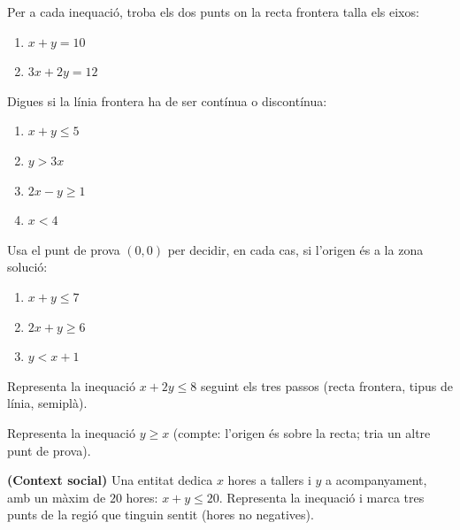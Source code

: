 \begin{exercicis}
\begin{exlist}
  \item Per a cada inequació, troba els dos punts on la recta frontera talla els
        eixos:
        \begin{enumerate}[label=\alph*), leftmargin=1.6em, topsep=2pt]
          \item $x+y=10$ \hfill \item $3x+2y=12$
        \end{enumerate}
  \item Digues si la línia frontera ha de ser contínua o discontínua:
        \begin{enumerate}[label=\alph*), leftmargin=1.6em, topsep=2pt]
          \item $x+y\le 5$ \hfill \item $y>3x$ \hfill \item $2x-y\ge 1$ \hfill
          \item $x<4$
        \end{enumerate}
  \item Usa el punt de prova $(0,0)$ per decidir, en cada cas, si l'origen és a la
        zona solució:
        \begin{enumerate}[label=\alph*), leftmargin=1.6em, topsep=2pt]
          \item $x+y\le 7$ \hfill \item $2x+y\ge 6$ \hfill \item $y<x+1$
        \end{enumerate}
  \item Representa la inequació $x+2y\le 8$ seguint els tres passos (recta frontera,
        tipus de línia, semiplà).
  \item Representa la inequació $y\ge x$ (compte: l'origen és sobre la recta; tria un
        altre punt de prova).
  \item \textbf{(Context social)} Una entitat dedica $x$ hores a tallers i $y$ a
        acompanyament, amb un màxim de $20$ hores: $x+y\le 20$. Representa la
        inequació i marca tres punts de la regió que tinguin sentit (hores no
        negatives).
\end{exlist}
\end{exercicis}

